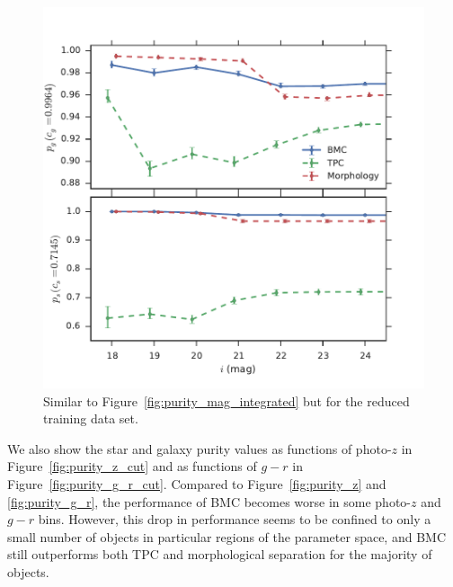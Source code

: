 \documentclass[useAMS,usenatbib]{mn2e}
\begin{document}
\begin{figure}
  \centering
  \includegraphics[width=\columnwidth]{figures/purity_mag_cut_integrated.pdf}
  \caption{Similar to Figure~\ref{fig:purity_mag_integrated}
           but for the reduced training data set.}
  \label{fig:purity_mag_cut_integrated}
\end{figure}


We also show the star and galaxy purity values as functions of
photo-$z$ in Figure~\ref{fig:purity_z_cut}
and as functions of $g-r$ in Figure~\ref{fig:purity_g_r_cut}.
Compared to Figure~\ref{fig:purity_z} and \ref{fig:purity_g_r},
the performance of BMC becomes worse in some photo-$z$ and $g-r$ bins.
However, this drop in performance seems to be confined to
only a small number of objects in particular regions of
the parameter space,
and BMC still outperforms both TPC and morphological separation
for the majority of objects.
\end{document}
